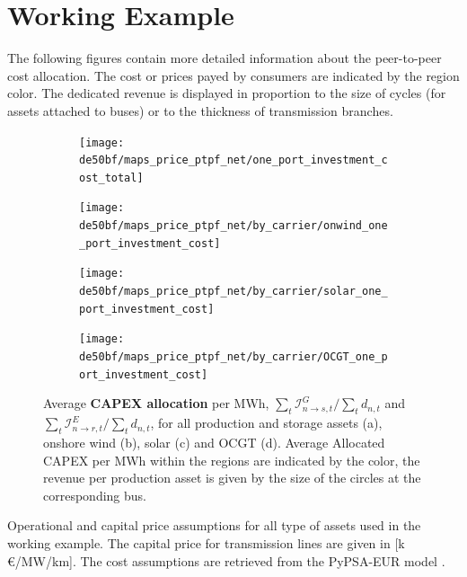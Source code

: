 \documentclass[11pt,twocolumn]{article}
\newcommand{\demand}[1][n]{d_{#1,t}}
\newcommand{\capexgeneration}{\mathcal{I}^G}
\newcommand{\capexstorage}{\mathcal{I}^E}
\newcommand{\allocatecapexgeneration}[1][n \rightarrow s]{\capexgeneration_{#1,t}}
\newcommand{\allocatecapexstorage}[1][n \rightarrow r]{\capexstorage_{#1,t}}
\begin{document}
% 
\section{Working Example}
The following figures contain more detailed information about the peer-to-peer cost allocation. The cost or prices payed by consumers are indicated by the region color. The dedicated revenue is displayed in proportion to the size of cycles (for assets attached to buses) or to the thickness of transmission branches.    
\begin{figure}
    \centering
    \begin{subfigure}[c]{.49\linewidth}
        \texttt{[image: de50bf/maps\_price\_ptpf\_net/one\_port\_investment\_cost\_total]}
        \label{fig:total_capex}
    \end{subfigure}
    \begin{subfigure}[c]{.49\linewidth}
        \texttt{[image: de50bf/maps\_price\_ptpf\_net/by\_carrier/onwind\_one\_port\_investment\_cost]}
        \label{fig:onshore_capex}
    \end{subfigure}
    \begin{subfigure}[c]{.49\linewidth}
        \texttt{[image: de50bf/maps\_price\_ptpf\_net/by\_carrier/solar\_one\_port\_investment\_cost]}
        \label{fig:solar_capex}
    \end{subfigure}
    \begin{subfigure}[c]{.49\linewidth}
        \texttt{[image: de50bf/maps\_price\_ptpf\_net/by\_carrier/OCGT\_one\_port\_investment\_cost]}
        \label{fig:ocgt_capex}
    \end{subfigure}
    \caption{Average \textbf{CAPEX allocation} per MWh, $\sum_t \allocatecapexgeneration / \sum_t \demand$ and $\sum_t \allocatecapexstorage / \sum_t \demand$, for all production and storage assets (a), onshore wind (b), solar (c) and OCGT (d). Average Allocated CAPEX per MWh within the regions are indicated by the color, the revenue per production asset is given by the size of the circles at the corresponding bus.}
    \label{fig:capex_price}
\end{figure}

\begin{table}[h]
    \centering
        
    \caption{Operational and capital price assumptions for all type of assets used in the working example. The capital price for transmission lines are given in [k\,\euro/MW/km]. The cost assumptions are retrieved from the PyPSA-EUR model \cite{horsch_jonas_pypsa-eur_2020}.}
    \label{tab:cost_assumptions}
\end{table} 
\end{document}
